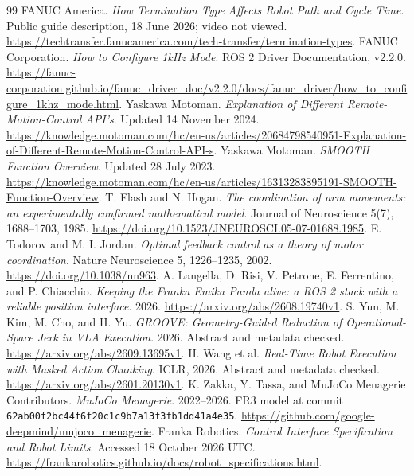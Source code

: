 \documentclass[11pt,letterpaper]{article}
\begin{document}
\begin{thebibliography}{99}
 FANUC America.
\emph{How Termination Type Affects Robot Path and Cycle Time}. Public guide description, 18 June 2026; video not viewed.
\url{https://techtransfer.fanucamerica.com/tech-transfer/termination-types}.
 FANUC Corporation.
\emph{How to Configure 1kHz Mode}. ROS 2 Driver Documentation, v2.2.0.
\url{https://fanuc-corporation.github.io/fanuc_driver_doc/v2.2.0/docs/fanuc_driver/how_to_configure_1khz_mode.html}.
 Yaskawa Motoman.
\emph{Explanation of Different Remote-Motion-Control API's}. Updated 14 November 2024.
\url{https://knowledge.motoman.com/hc/en-us/articles/20684798540951-Explanation-of-Different-Remote-Motion-Control-API-s}.
 Yaskawa Motoman.
\emph{SMOOTH Function Overview}. Updated 28 July 2023.
\url{https://knowledge.motoman.com/hc/en-us/articles/16313283895191-SMOOTH-Function-Overview}.
 T. Flash and N. Hogan.
\emph{The coordination of arm movements: an experimentally confirmed mathematical model}.
Journal of Neuroscience 5(7), 1688--1703, 1985.
\url{https://doi.org/10.1523/JNEUROSCI.05-07-01688.1985}.
 E. Todorov and M. I. Jordan.
\emph{Optimal feedback control as a theory of motor coordination}.
Nature Neuroscience 5, 1226--1235, 2002.
\url{https://doi.org/10.1038/nn963}.
 A. Langella, D. Risi, V. Petrone, E. Ferrentino, and P. Chiacchio.
\emph{Keeping the Franka Emika Panda alive: a ROS 2 stack with a reliable position interface}. 2026.
\url{https://arxiv.org/abs/2608.19740v1}.
 S. Yun, M. Kim, M. Cho, and H. Yu.
\emph{GROOVE: Geometry-Guided Reduction of Operational-Space Jerk in VLA Execution}. 2026. Abstract and metadata checked.
\url{https://arxiv.org/abs/2609.13695v1}.
 H. Wang et al.
\emph{Real-Time Robot Execution with Masked Action Chunking}. ICLR, 2026. Abstract and metadata checked.
\url{https://arxiv.org/abs/2601.20130v1}.
 K. Zakka, Y. Tassa, and MuJoCo Menagerie Contributors.
\emph{MuJoCo Menagerie}. 2022--2026. FR3 model at commit \texttt{62ab00f2bc44f6f20c1c9b7a13f3fb1dd41a4e35}.
\url{https://github.com/google-deepmind/mujoco_menagerie}.
 Franka Robotics.
\emph{Control Interface Specification and Robot Limits}. Accessed 18 October 2026 UTC.
\url{https://frankarobotics.github.io/docs/robot_specifications.html}.
\end{thebibliography}
\end{document}

